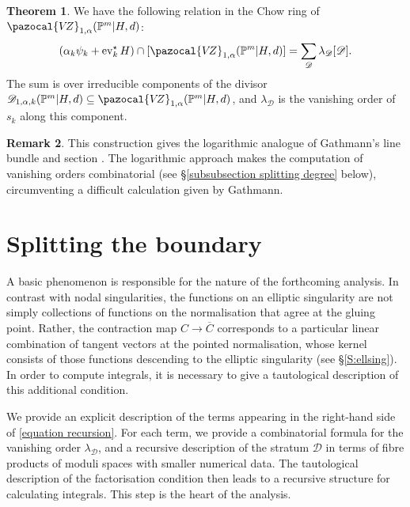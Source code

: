 \documentclass[11pt]{amsart}
\newcommand{\PP}{\mathbb P}
\newcommand{\VZ}{\pazocal{V\!Z}}
\newcommand{\st}{\star}
\renewcommand{\to}{\rightarrow}
\newcommand{\ev}{\operatorname{ev}}
\newcommand{\Dcal}{\mathcal{D}}
\theoremstyle{definition}
\newtheorem{thm}{Theorem}[section]
\theoremstyle{definition}
\newtheorem{remark}[thm]{Remark}
\begin{document}
\begin{thm} \label{theorem recursion} We have the following relation in the Chow ring of $\VZ_{1,\alpha}(\PP^m|H,d)$:
\begin{equation}\label{equation recursion} (\alpha_k \psi_k + \ev_k^\st H) \cap [\VZ_{1,\alpha}(\PP^m|H,d)] = \sum_{\Dcal} \lambda_\Dcal [ \Dcal ].\end{equation}
The sum is over irreducible components of the divisor $\Dcal_{1,\alpha,k}(\PP^m|H,d) \subseteq \VZ_{1,\alpha}(\PP^m|H,d)$, and $\lambda_\Dcal$ is the vanishing order of $s_k$ along this component. \end{thm}

\begin{remark} This construction gives the logarithmic analogue of Gathmann's line bundle and section \cite[Construction 2.1]{Ga}. The logarithmic approach makes the computation of vanishing orders combinatorial (see \S \ref{subsubsection splitting degree} below), circumventing a difficult calculation given by Gathmann. \end{remark}

\section{Splitting the boundary}\label{section reduced splitting}

\noindent A basic phenomenon is responsible for the nature of the forthcoming analysis. In contrast with nodal singularities, the functions on an elliptic singularity are not simply collections of functions on the normalisation that agree at the gluing point. Rather, the contraction map $C\to\overline C$ corresponds to a particular linear combination of tangent vectors at the pointed normalisation, whose kernel consists of those functions descending to the elliptic singularity (see \S \ref{S:ellsing}). In order to compute integrals, it is necessary to give a tautological description of this additional condition. %

We provide an explicit description of the terms appearing in the right-hand side of \eqref{equation recursion}.  For each term, we provide a combinatorial formula for the vanishing order $\lambda_\Dcal$, and a recursive description of the stratum $\Dcal$ 
in terms of fibre products of moduli spaces with smaller numerical data. The tautological description of the factorisation condition then leads to a recursive structure for calculating integrals. This step is the heart of the analysis. 
\end{document}
